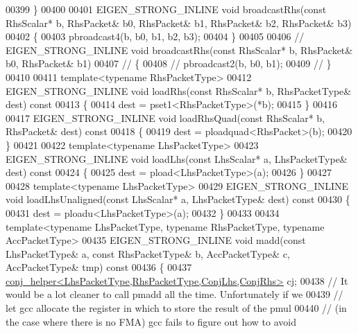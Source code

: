 \begin{DoxyCode}
00399   \}
00400   
00401   EIGEN\_STRONG\_INLINE \textcolor{keywordtype}{void} broadcastRhs(\textcolor{keyword}{const} RhsScalar* b, RhsPacket& b0, RhsPacket& b1, RhsPacket& b2, 
      RhsPacket& b3)
00402   \{
00403     pbroadcast4(b, b0, b1, b2, b3);
00404   \}
00405   
00406 \textcolor{comment}{//   EIGEN\_STRONG\_INLINE void broadcastRhs(const RhsScalar* b, RhsPacket& b0, RhsPacket& b1)}
00407 \textcolor{comment}{//   \{}
00408 \textcolor{comment}{//     pbroadcast2(b, b0, b1);}
00409 \textcolor{comment}{//   \}}
00410   
00411   \textcolor{keyword}{template}<\textcolor{keyword}{typename} RhsPacketType>
00412   EIGEN\_STRONG\_INLINE \textcolor{keywordtype}{void} loadRhs(\textcolor{keyword}{const} RhsScalar* b, RhsPacketType& dest)\textcolor{keyword}{ const}
00413 \textcolor{keyword}{  }\{
00414     dest = pset1<RhsPacketType>(*b);
00415   \}
00416   
00417   EIGEN\_STRONG\_INLINE \textcolor{keywordtype}{void} loadRhsQuad(\textcolor{keyword}{const} RhsScalar* b, RhsPacket& dest)\textcolor{keyword}{ const}
00418 \textcolor{keyword}{  }\{
00419     dest = ploadquad<RhsPacket>(b);
00420   \}
00421 
00422   \textcolor{keyword}{template}<\textcolor{keyword}{typename} LhsPacketType>
00423   EIGEN\_STRONG\_INLINE \textcolor{keywordtype}{void} loadLhs(\textcolor{keyword}{const} LhsScalar* a, LhsPacketType& dest)\textcolor{keyword}{ const}
00424 \textcolor{keyword}{  }\{
00425     dest = pload<LhsPacketType>(a);
00426   \}
00427 
00428   \textcolor{keyword}{template}<\textcolor{keyword}{typename} LhsPacketType>
00429   EIGEN\_STRONG\_INLINE \textcolor{keywordtype}{void} loadLhsUnaligned(\textcolor{keyword}{const} LhsScalar* a, LhsPacketType& dest)\textcolor{keyword}{ const}
00430 \textcolor{keyword}{  }\{
00431     dest = ploadu<LhsPacketType>(a);
00432   \}
00433 
00434   \textcolor{keyword}{template}<\textcolor{keyword}{typename} LhsPacketType, \textcolor{keyword}{typename} RhsPacketType, \textcolor{keyword}{typename} AccPacketType>
00435   EIGEN\_STRONG\_INLINE \textcolor{keywordtype}{void} madd(\textcolor{keyword}{const} LhsPacketType& a, \textcolor{keyword}{const} RhsPacketType& b, AccPacketType& c, 
      AccPacketType& tmp)\textcolor{keyword}{ const}
00436 \textcolor{keyword}{  }\{
00437     \hyperlink{struct_eigen_1_1internal_1_1conj__helper}{conj\_helper<LhsPacketType,RhsPacketType,ConjLhs,ConjRhs>}
       cj;
00438     \textcolor{comment}{// It would be a lot cleaner to call pmadd all the time. Unfortunately if we}
00439     \textcolor{comment}{// let gcc allocate the register in which to store the result of the pmul}
00440     \textcolor{comment}{// (in the case where there is no FMA) gcc fails to figure out how to avoid}

\end{DoxyCode}
